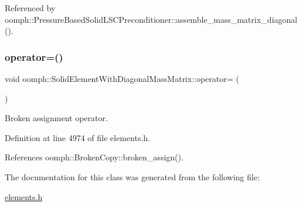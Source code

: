 Referenced by oomph\+::\+Pressure\+Based\+Solid\+L\+S\+C\+Preconditioner\+::assemble\+\_\+mass\+\_\+matrix\+\_\+diagonal().

\mbox{\label{classoomph_1_1SolidElementWithDiagonalMassMatrix_af7f7f5c4068cbfa7237be672d5b0fa58}} 
\subsubsection{\texorpdfstring{operator=()}{operator=()}}
{\footnotesize\ttfamily void oomph\+::\+Solid\+Element\+With\+Diagonal\+Mass\+Matrix\+::operator= (\begin{DoxyParamCaption}\item[{const \hyperlink{classoomph_1_1SolidElementWithDiagonalMassMatrix}{Solid\+Element\+With\+Diagonal\+Mass\+Matrix} \&}]{ }\end{DoxyParamCaption})\hspace{0.3cm}{\ttfamily [inline]}}



Broken assignment operator. 



Definition at line 4974 of file elements.\+h.



References oomph\+::\+Broken\+Copy\+::broken\+\_\+assign().



The documentation for this class was generated from the following file\+:\begin{DoxyCompactItemize}
\item 
\hyperlink{elements_8h}{elements.\+h}\end{DoxyCompactItemize}
